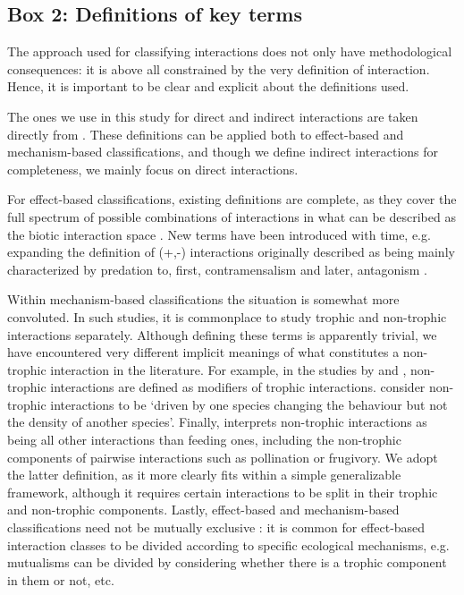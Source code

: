 \begin{mdframed}
\begin{small}

\subsection*{Box 2: Definitions of key terms}

The approach used for classifying interactions does not only have methodological consequences: it is above all constrained by the very definition of interaction. Hence, it is important to be clear and explicit about the definitions used.

The ones we use in this study for direct and indirect interactions are taken directly from \cite{Abrams1987}. These definitions can be applied both to effect-based and mechanism-based classifications, and though we define indirect interactions for completeness, we mainly focus on direct interactions.

For effect-based classifications, existing definitions are complete, as they cover the full spectrum of possible combinations of interactions in what can be described as the biotic interaction space \citep{Araujo2014}. New terms have been introduced with time, e.g. expanding the definition of (+,-) interactions originally described as being mainly characterized by predation to, first, contramensalism \citep{Arthur1989} and later, antagonism \citep{Sousa1993}.

Within mechanism-based classifications the situation is somewhat more convoluted. In such studies, it is commonplace to study trophic and non-trophic interactions separately. Although defining these terms is apparently trivial, we have encountered very different implicit meanings of what constitutes a non-trophic interaction in the literature. For example, in the studies by \cite{Arditi2005} and \cite{Goudard2008}, non-trophic interactions are defined as modifiers of trophic interactions. \cite{Prasad2010} consider non-trophic interactions to be `driven by one species changing the behaviour but not the density of another species'. Finally, \cite{Kefi2012} interprets non-trophic interactions as being all other interactions than feeding ones, including the non-trophic components of pairwise interactions such as pollination or frugivory. We adopt the latter definition, as it more clearly fits within a simple generalizable framework, although it requires certain interactions to be split in their trophic and non-trophic components. Lastly, effect-based and mechanism-based classifications need not be mutually exclusive \citep{Abrams1987}: it is common for effect-based interaction classes to be divided according to specific ecological mechanisms, e.g. mutualisms can be divided by considering whether there is a trophic component in them or not, etc.


\end{small}
\end{mdframed}
